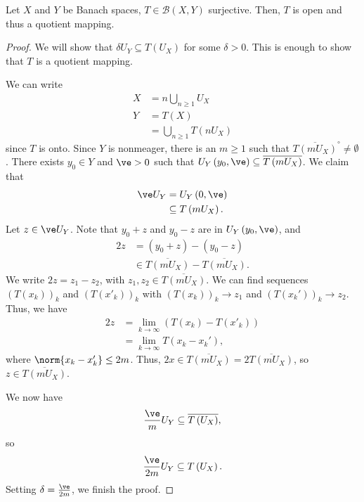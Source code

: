 \documentclass[10pt]{mypackage}
\begin{document}
  \begin{theorem}
    Let $X$ and $Y$ be Banach spaces, $T\in \mathcal{B}\left(X,Y\right)$ surjective. Then, $T$ is open and thus a quotient mapping.
  \end{theorem}
  \begin{proof}
    We will show that $\delta U_Y\subseteq T\left(U_X\right)$ for some $\delta > 0$. This is enough to show that $T$ is a quotient mapping.\newline

    We can write
    \begin{align*}
      X &= n\bigcup_{n\geq 1}U_X\\
      Y &= T\left(X\right)\\
        &= \bigcup_{n\geq 1}T\left(nU_X\right)
    \end{align*}
    since $T$ is onto. Since $Y$ is nonmeager, there is an $m \geq 1$ such that $\overline{T\left(mU_X\right)}^{\circ} \neq \emptyset$. There exists $y_0\in Y$ and $\ve > 0$ such that $U_Y\left(y_0,\ve\right) \subseteq \overline{T\left(mU_X\right)}$. We claim that
    \begin{align*}
      \ve U_Y &= U_Y\left(0,\ve\right)\\
              &\subseteq T\left(mU_X\right).
    \end{align*}
    Let $z\in \ve U_Y$. Note that $y_0 + z$ and $y_0 - z$ are in $U_Y\left(y_0,\ve\right)$, and
    \begin{align*}
      2z &= \left(y_0 + z\right) - \left(y_0 - z\right)\\
         &\in \overline{T\left(mU_X\right)} - \overline{T\left(mU_X\right)}.
    \end{align*}
    We write $2z = z_1 - z_2$, with $z_1,z_2\in \overline{T\left(mU_X\right)}$. We can find sequences $\left(T\left(x_k\right)\right)_k$ and $\left(T\left(x'_k\right)\right)_k$ with $\left(T\left(x_k\right)\right)_k\rightarrow z_1$ and $\left(T\left(x_k'\right)\right)_k\rightarrow z_2$. Thus, we have
    \begin{align*}
      2z &= \lim_{k\rightarrow\infty}\left(T\left(x_k\right) - T\left(x'_k\right)\right)\\
         &= \lim_{k\rightarrow\infty}T\left(x_k -x_k'\right),
    \end{align*}
    where $\norm{x_k - x_k'} \leq 2m$. Thus, $2x\in \overline{T\left(mU_X\right)} = 2\overline{T\left(mU_X\right)}$, so $z\in \overline{T\left(mU_X\right)}$.\newline

    We now have
    \begin{align*}
      \frac{\ve}{m}U_Y\subseteq \overline{T\left(U_X\right)},
    \end{align*}
    so
    \begin{align*}
      \frac{\ve}{2m}U_Y\subseteq T\left(U_X\right).
    \end{align*}
    Setting $\delta = \frac{\ve}{2m}$, we finish the proof.
  \end{proof}
\end{document}
